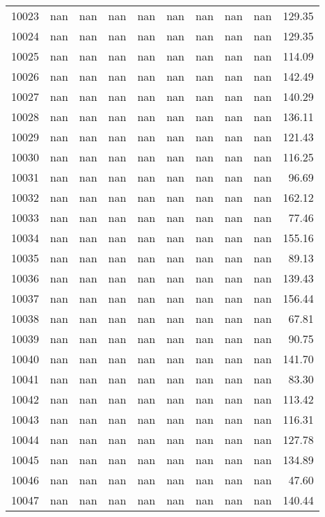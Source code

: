 \begin{tabular}{lrrrrrrrrr}
10023 & nan & nan & nan & nan & nan & nan & nan & nan & 129.35 \\
10024 & nan & nan & nan & nan & nan & nan & nan & nan & 129.35 \\
10025 & nan & nan & nan & nan & nan & nan & nan & nan & 114.09 \\
10026 & nan & nan & nan & nan & nan & nan & nan & nan & 142.49 \\
10027 & nan & nan & nan & nan & nan & nan & nan & nan & 140.29 \\
10028 & nan & nan & nan & nan & nan & nan & nan & nan & 136.11 \\
10029 & nan & nan & nan & nan & nan & nan & nan & nan & 121.43 \\
10030 & nan & nan & nan & nan & nan & nan & nan & nan & 116.25 \\
10031 & nan & nan & nan & nan & nan & nan & nan & nan & 96.69 \\
10032 & nan & nan & nan & nan & nan & nan & nan & nan & 162.12 \\
10033 & nan & nan & nan & nan & nan & nan & nan & nan & 77.46 \\
10034 & nan & nan & nan & nan & nan & nan & nan & nan & 155.16 \\
10035 & nan & nan & nan & nan & nan & nan & nan & nan & 89.13 \\
10036 & nan & nan & nan & nan & nan & nan & nan & nan & 139.43 \\
10037 & nan & nan & nan & nan & nan & nan & nan & nan & 156.44 \\
10038 & nan & nan & nan & nan & nan & nan & nan & nan & 67.81 \\
10039 & nan & nan & nan & nan & nan & nan & nan & nan & 90.75 \\
10040 & nan & nan & nan & nan & nan & nan & nan & nan & 141.70 \\
10041 & nan & nan & nan & nan & nan & nan & nan & nan & 83.30 \\
10042 & nan & nan & nan & nan & nan & nan & nan & nan & 113.42 \\
10043 & nan & nan & nan & nan & nan & nan & nan & nan & 116.31 \\
10044 & nan & nan & nan & nan & nan & nan & nan & nan & 127.78 \\
10045 & nan & nan & nan & nan & nan & nan & nan & nan & 134.89 \\
10046 & nan & nan & nan & nan & nan & nan & nan & nan & 47.60 \\
10047 & nan & nan & nan & nan & nan & nan & nan & nan & 140.44 \\

\end{tabular}
